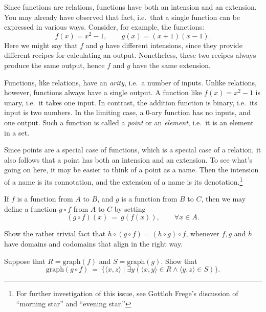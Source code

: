 Since functions are relations, functions have both an intension and an
extension.  You may already have observed that fact, i.e.\ that a
single function can be expressed in various ways.  Consider, for
example, the functions:
\[ f(x)=x^2-1 ,\qquad g(x)=(x+1)(x-1) .\] Here we might say that $f$
and $g$ have different intensions, since they provide different
recipes for calculating an output.  Nonetheless, these two recipes
always produce the same output, hence $f$ and $g$ have the same
extension.

Functions, like relations, have an \emph{arity}, i.e.\ a number of
inputs.  Unlike relations, however, functions always have a single
output.  A function like $f(x)=x^2-1$ is unary, i.e.\ it takes one
input.  In contrast, the addition function is binary, i.e.\ its input
is two numbers.  In the limiting case, a $0$-ary function has no
inputs, and one output.  Such a function is called a \emph{point} or
an \emph{element}, i.e.\ it is an element in a set.

Since points are a special case of functions, which is a special case
of a relation, it also follows that a point has both an intension and
an extension.  To see what's going on here, it may be easier to think
of a point as a name.  Then the intension of a name is its
connotation, and the extension of a name is its
denotation.\footnote{For further investigation of this issue, see
  Gottlob Frege's discussion of ``morning star'' and ``evening
  star.''}

If $f$ is a function from $A$ to $B$, and $g$ is a function from $B$
to $C$, then we may define a function $g\circ f$ from $A$ to $C$ by
setting
\[ (g\circ f)(x) \: = \: g(f(x)),\qquad \forall x\in A .\]

\begin{exercise} Show the rather trivial fact that
  $h\circ (g\circ f)=(h\circ g)\circ f$, whenever $f,g$ and $h$ have
  domains and codomains that align in the right way. \end{exercise}

\begin{exercise} Suppose that $R=\mathrm{graph}(f)$ and
  $S=\mathrm{graph}(g)$.  Show that
  \[ \mathrm{graph}(g\circ f)\: = \: \bigl\{ \langle x,z\rangle \mid
    \exists y(\langle x,y\rangle \in R\wedge \langle y,z\rangle\in S) \bigr\} .\]  \end{exercise}



